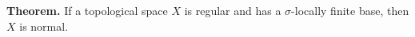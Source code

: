 \textbf{Theorem.} If a topological space $X$ is regular and has a $\sigma$-locally finite base, then $X$ is normal.
